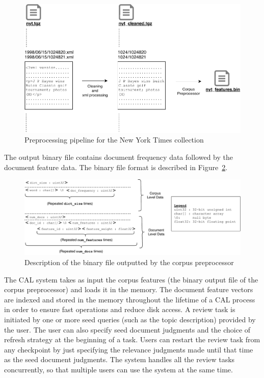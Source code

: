 \begin{figure}[h]
\includegraphics[width=\textwidth]{figures/corpus_pipeline.pdf}
\caption{Preprocessing pipeline for the New York Times collection}
\label{fig:preprocessing}
\end{figure}

The output binary file contains document frequency data followed by the document
feature data. The binary file format is described in
Figure~\ref{fig:binary_format}.

\begin{figure}[h]
\includegraphics[width=\textwidth]{figures/binary_format.pdf}
\caption{Description of the binary file outputted by the corpus preprocessor}
\label{fig:binary_format}
\end{figure}

The CAL system takes as input the corpus features (the binary output file of the
corpus preprocessor) and loads it in the memory. The document feature vectors
are indexed and stored in the memory throughout the lifetime of a CAL process in order to
ensure fast operations and reduce disk access. A review task is initiated by one
or more seed queries (such as the topic description) provided by the user. The
user can also specify seed document judgments and the choice of refresh strategy
at the beginning of a task. Users can restart the review task from any
checkpoint by just specifying the relevance judgments made until that time as
the seed document judgments. The system handles all the review tasks concurrently, so that
multiple users can use the system at the same time.


